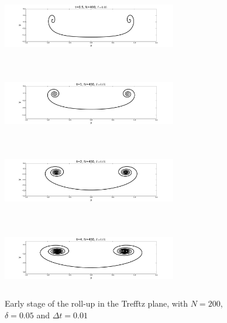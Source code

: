\documentclass[12pt,twoside]{article}
\begin{document}
\begin{figure}
\begin{center}
	\includegraphics[width=3in,height=1.33in]{tr4.pdf}

	\includegraphics[width=3in,height=1.33in]{tr5.pdf}



	\includegraphics[width=3in,height=1.33in]{tr6.pdf}


	\includegraphics[width=3in,height=1.33in]{tr7.pdf}
\caption{Early stage of the roll-up in the Trefftz plane, with $N=200$, $\delta=0.05$ and $\Delta t=0.01$}
\end{center}
\end{figure}
\clearpage
\end{document}
